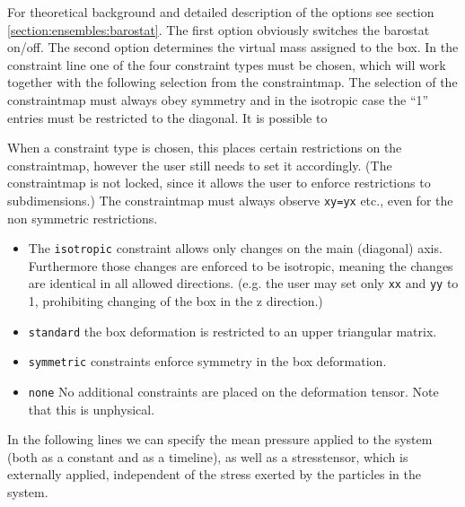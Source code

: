 For theoretical background and detailed description of the options see section \ref{section:ensembles:barostat}.
The first option obviously switches the barostat on/off. The second option determines the virtual mass
assigned to the box.
In the constraint line one of the four constraint types must be chosen, which will work together with the 
following selection from the constraintmap.
The selection of the constraintmap must always obey symmetry and in the isotropic case the ``1'' entries
must be restricted to the diagonal. It is possible to 



When a constraint type is chosen, this places certain restrictions on the constraintmap, however the user still needs to set it accordingly. 
(The constraintmap is not locked, since it allows the user to enforce restrictions to subdimensions.)
The constraintmap must always observe \texttt{xy=yx} etc., even for the non symmetric restrictions.
\begin{itemize}
\item The \texttt{isotropic} constraint allows only changes on the main (diagonal) axis. Furthermore those changes are enforced to be isotropic, meaning the changes are identical in all allowed directions. (e.g. the user may set only \texttt{xx} and \texttt{yy} to 1, prohibiting changing of the box in the z direction.)
\item \texttt{standard} the box deformation is restricted to an upper triangular matrix.
\item \texttt{symmetric} constraints enforce symmetry in the box deformation. 
\item \texttt{none} No additional constraints are placed on the deformation tensor. Note that this is unphysical.
\end{itemize}

In the following lines we can specify the mean pressure applied to the system (both as a constant and as a timeline), as well as a stresstensor, 
which is externally applied, independent of the stress exerted by the particles in the system.

